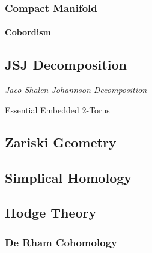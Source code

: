 \subsubsection{Compact Manifold}\label{sec:compact_manifold}

\paragraph{Cobordism}\label{sec:cobordism}



\subsection{JSJ Decomposition}\label{sec:jsj_decomposition}

\emph{Jaco-Shalen-Johannson Decomposition}

Essential Embedded 2-Torus



\subsection{Zariski Geometry}\label{sec:zariski_geometry}

\subsection{Simplical Homology}\label{sec:simplical_homology}

\subsection{Hodge Theory}\label{sec:hodge_theory}

\subsubsection{De Rham Cohomology}\label{sec:derham_cohomology}



